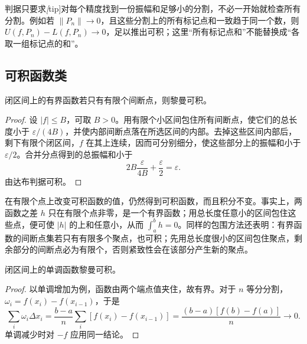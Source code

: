 \documentclass[UTF8,12pt,a4paper,fontset=fandol]{ctexbook}
\begin{document}
判据只要求\emph[tip]{对每个精度找到一份振幅和足够小的分割}，不必一开始就检查所有分割。例如若 $\|P_n\|\to0$，且这些分割上的所有标记点和一致趋于同一个数，则 $U(f,P_n)-L(f,P_n)\to0$，足以推出可积；这里“所有标记点和”不能替换成“各取一组标记点的和”。

\subsection{可积函数类}
\label{subsec:classes-of-integrable-functions}

\begin{theorem}
\label{thm:finite-discontinuities-integrable}
闭区间上的有界函数若只有有限个间断点，则黎曼可积。
\end{theorem}
\begin{proof}
设 $|f|\leq B$，可取 $B>0$。用有限个小区间包住所有间断点，使它们的总长度小于 $\varepsilon/(4B)$，并使内部间断点落在所选区间的内部。去掉这些区间内部后，剩下有限个闭区间，$f$ 在其上连续，因而可分别细分，使这些部分上的振幅和小于 $\varepsilon/2$。合并分点得到的总振幅和小于
\[
    2B\frac{\varepsilon}{4B}+\frac{\varepsilon}{2}=\varepsilon.
\]
由达布判据可积。
\end{proof}

在有限个点上改变可积函数的值，仍然得到可积函数，而且积分不变。事实上，两函数之差 $h$ 只在有限个点非零，是一个有界函数；用总长度任意小的区间包住这些点，便可使 $|h|$ 的上和任意小，从而 $\int_a^b h=0$。同样的包围方法还表明：有界函数的间断点集若只有有限多个聚点，也可积；先用总长度很小的区间包住聚点，剩余部分的间断点必为有限个，否则紧致性会在该部分产生新的聚点。

\begin{theorem}
\label{thm:monotone-functions-riemann-integrable}
闭区间上的单调函数黎曼可积。
\end{theorem}
\begin{proof}
以单调增加为例，函数由两个端点值夹住，故有界。对于 $n$ 等分分割，$\omega_i=f(x_i)-f(x_{i-1})$，于是
\[
    \sum_i\omega_i\Delta x_i
    =\frac{b-a}{n}\sum_i[f(x_i)-f(x_{i-1})]
    =\frac{(b-a)[f(b)-f(a)]}{n}\longrightarrow0.
\]
单调减少时对 $-f$ 应用同一结论。
\end{proof}
\end{document}
